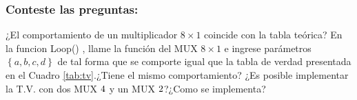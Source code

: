\subsubsection{Conteste las preguntas:}

¿El comportamiento de un multiplicador $8 \times 1$ coincide con la tabla teórica?
En la funcion Loop() , llame la función del MUX  $8 \times 1$ e ingrese parámetros $\left\lbrace a,b,c,d \right\rbrace $ de tal forma que se comporte igual que la tabla de verdad presentada en el Cuadro \ref{tab:tv}.¿Tiene el mismo comportamiento?
¿Es posible implementar la T.V. con dos MUX $4 \time 1$ y un MUX  $2 \time 1$?¿Como se implementa?
